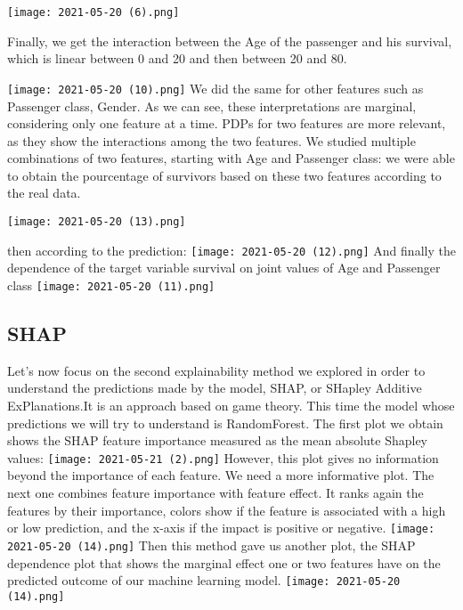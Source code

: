 \documentclass[sigplan,screen]{acmart}
\begin{document}
    \centering
      \texttt{[image: 2021-05-20 (6).png]}
      
Finally, we get the interaction between the Age of the passenger and his survival, which is linear between 0 and 20 and then between 20 and 80.

     \centering
      \texttt{[image: 2021-05-20 (10).png]}
We did the same for other features such as Passenger class, Gender. As we can see, these interpretations are marginal, considering only one feature at a time. PDPs for two features are more relevant, as they show the interactions among the two features. We studied multiple combinations of two features, starting with Age and Passenger class: we were able to obtain the pourcentage of survivors based on these two features according to the real data.

    \centering
      \texttt{[image: 2021-05-20 (13).png]}
      
    then according to the prediction:
    \centering
      \texttt{[image: 2021-05-20 (12).png]}
And finally the dependence of the target variable survival on joint values of Age and Passenger class
      \centering
      \texttt{[image: 2021-05-20 (11).png]}
\subsection{SHAP}
\large
Let's now focus on the second explainability method we explored in order to understand the predictions made by the model, SHAP, or SHapley Additive ExPlanations.It is an approach based on game theory.
This time the model whose predictions we will try to understand is RandomForest.
The first plot we obtain shows the SHAP feature importance measured as the mean absolute Shapley values:
\centering
      \texttt{[image: 2021-05-21 (2).png]}
However, this plot gives no information beyond the importance of each feature. We need a more informative plot. The next one combines feature importance with feature effect. It ranks again the features by their importance, colors show if the feature is associated with a high or low prediction, and the x-axis if the impact is positive or negative.
\centering
      \texttt{[image: 2021-05-20 (14).png]}
Then this method gave us another plot, the SHAP dependence plot that shows the marginal effect one or two features have on the predicted outcome of our machine learning model.
\centering
      \texttt{[image: 2021-05-20 (14).png]}
\end{document}
